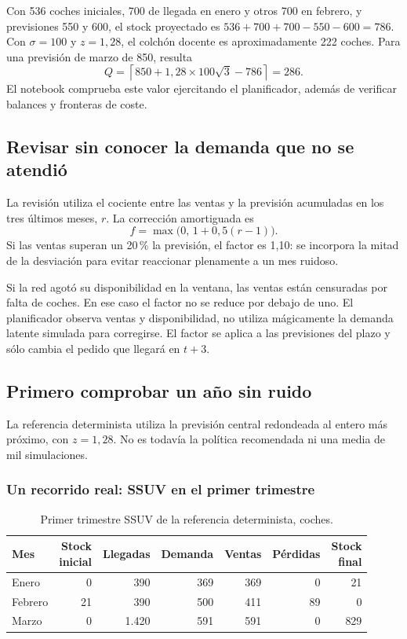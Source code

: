Con 536 coches iniciales, 700 de llegada en enero y otros 700 en febrero,
y previsiones 550 y 600, el stock proyectado es $536+700+700-550-600=786$.
Con $\sigma=100$ y $z=1{,}28$, el colchón docente es aproximadamente 222 coches.
Para una previsión de marzo de 850, resulta
\[
 Q=\left\lceil850+1{,}28\times100\sqrt3-786\right\rceil=286.
\]
El notebook comprueba este valor ejercitando el planificador, además de verificar
balances y fronteras de coste.

\subsection{Revisar sin conocer la demanda que no se atendió}
La revisión utiliza el cociente entre las ventas y la previsión acumuladas en
los tres últimos meses, $r$. La corrección amortiguada es
\begin{equation}\label{eq:revision}
 f=\max\bigl(0,\,1+0{,}5(r-1)\bigr).
\end{equation}
Si las ventas superan un 20\,\% la previsión, el factor es 1,10: se incorpora
la mitad de la desviación para evitar reaccionar plenamente a un mes ruidoso.

Si la red agotó su disponibilidad en la ventana, las ventas están censuradas
por falta de coches. En ese caso el factor no se reduce por debajo de uno.
El planificador observa ventas y disponibilidad, no utiliza mágicamente la
demanda latente simulada para corregirse. El factor se aplica a las previsiones
del plazo y sólo cambia el pedido que llegará en $t+3$.

\subsection{Primero comprobar un año sin ruido}
La referencia determinista utiliza la previsión central redondeada al entero
más próximo, con $z=1{,}28$. No es todavía la política recomendada ni una media
de mil simulaciones.

\subsubsection*{Un recorrido real: SSUV en el primer trimestre}
\begin{table}[H]\centering
\caption{Primer trimestre SSUV de la referencia determinista, coches.}
\begin{tabular}{@{}lrrrrrr@{}}\toprule
Mes & \makecell{Stock\\inicial} & Llegadas & Demanda & Ventas & Pérdidas & \makecell{Stock\\final} \\\midrule
Enero & 0 & 390 & 369 & 369 & 0 & 21 \\
Febrero & 21 & 390 & 500 & 411 & 89 & 0 \\
Marzo & 0 & 1.420 & 591 & 591 & 0 & 829 \\\bottomrule
\end{tabular}
\end{table}

